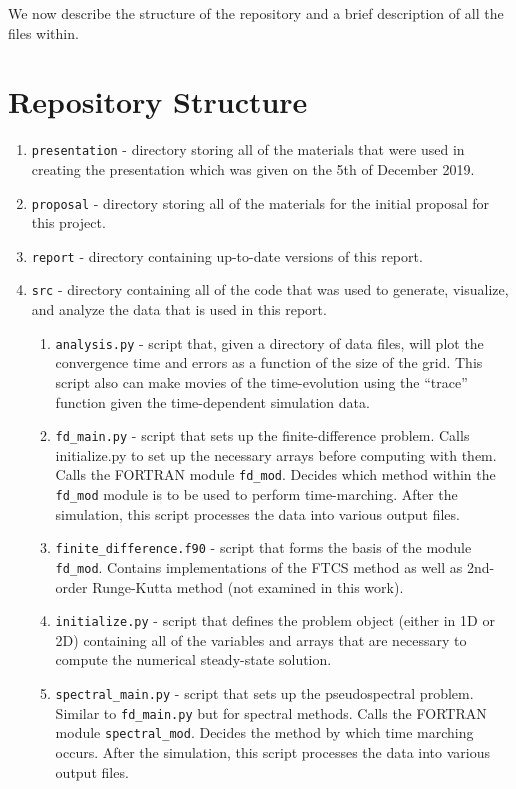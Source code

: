 \documentclass[11pt]{article}
\begin{document}
\noindent We now describe the structure of the repository and a brief description of all the files within. 

\section{Repository Structure}

\begin{enumerate}
    \item \verb|presentation| - directory storing all of the materials that were used in creating the presentation which was given on the 5th of December 2019.
    \item \verb|proposal| - directory storing all of the materials for the initial proposal for this project.
    \item \verb|report| - directory containing up-to-date versions of this report.
    \item \verb|src| - directory containing all of the code that was used to generate, visualize, and analyze the data that is used in this report.
    \begin{enumerate}
        \item \verb|analysis.py| - script that, given a directory of data files, will plot the convergence time and errors as a function of the size of the grid. This script also can make movies of the time-evolution using the ``trace'' function given the time-dependent simulation data. 
        \item \verb|fd_main.py| - script that sets up the finite-difference problem. Calls initialize.py to set up the necessary arrays before computing with them. Calls the FORTRAN module \verb|fd_mod|. Decides which method within the \verb|fd_mod| module is to be used to perform time-marching. After the simulation, this script processes the data into various output files.
        \item \verb|finite_difference.f90| - script that forms the basis of the module \verb|fd_mod|. Contains implementations of the FTCS method as well as 2nd-order Runge-Kutta method (not examined in this work). 
        \item \verb|initialize.py| - script that defines the problem object (either in 1D or 2D) containing all of the variables and arrays that are necessary to compute the numerical steady-state solution. 
        \item \verb|spectral_main.py| - script that sets up the pseudospectral problem. Similar to \verb|fd_main.py| but for spectral methods. Calls the FORTRAN module \verb|spectral_mod|. Decides the method by which time marching occurs. After the simulation, this script processes the data into various output files.

\end{enumerate}
\end{enumerate}
\end{document}
